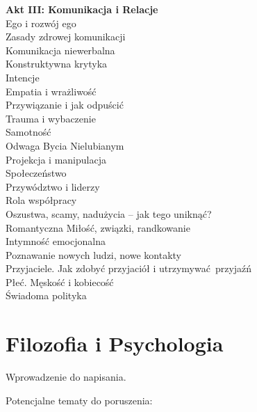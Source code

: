 \documentclass[]{coda-art}
\begin{document}
\textbf{Akt III: Komunikacja i Relacje} \\
Ego i rozwój ego \\
Zasady zdrowej komunikacji \\
Komunikacja niewerbalna \\
Konstruktywna krytyka \\
Intencje \\
Empatia i wrażliwość \\
Przywiązanie i jak odpuścić \\
Trauma i wybaczenie \\
Samotność \\
Odwaga Bycia Nielubianym \\
Projekcja i manipulacja \\
Społeczeństwo \\
Przywództwo i liderzy \\
Rola współpracy \\
Oszustwa, scamy, nadużycia -- jak tego uniknąć? \\
Romantyczna Miłość, związki, randkowanie \\
Intymność emocjonalna \\
Poznawanie nowych ludzi, nowe kontakty \\
Przyjaciele. Jak zdobyć przyjaciół i utrzymywać przyjaźń \\
Płeć. Męskość i kobiecość \\
Świadoma polityka



\clearpage\part{Filozofia i Psychologia}
\label{akt:filozofia}

Wprowadzenie do napisania.

\vin Potencjalne tematy do poruszenia:
\end{document}
